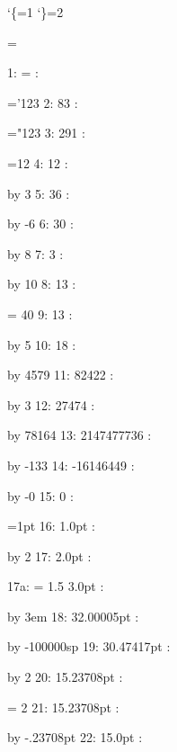 \catcode`\{=1 %
\catcode`\}=2 %





 {=}

1: = : \the{}



='123
2: 83 : \the{}

="123
3: 291 : \the{}


=12
4: 12 : \the{}

\multiply {} by 3
5: 36 : \the{}

\advance {} by -6
6: 30 : \the{}

\divide {} by 8
7: 3 : \the{}

\advance {} by 10
8: 13 : \the{}


\countdef\nase = 40
9: 13 : \the\nase

\advance \nase by 5
10: 18 : \the\nase

\multiply\nase by 4579
11: 82422 : \the\nase

\divide\nase by 3
12: 27474 : \the\nase

\multiply\nase by 78164
13: 2147477736 : \the\nase

\divide\nase by -133
14: -16146449 : \the\nase

\multiply \nase by -0
15: 0 : \the\nase


=1pt
16: 1.0pt : \the{}

\multiply{} by 2
17: 2.0pt : \the{}

17a:  = 1.5
3.0pt : \the{}

\advance{} by 3em
18: 32.00005pt : \the{}

\advance{} by -100000sp
19: 30.47417pt : \the{}

\divide{} by 2
20: 15.23708pt : \the{}


\dimendef\hand = 2
21: 15.23708pt : \the\hand

\advance\hand by -.23708pt
22: 15.0pt : \the\hand

